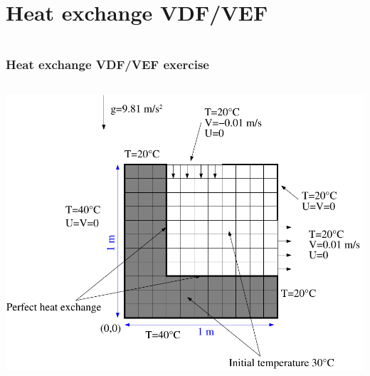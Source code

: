\documentclass[10pt]{beamer}
\begin{document}
\section{Heat exchange VDF/VEF}
\begin{frame}
\begin{columns}[c] 
\tableofcontents[sections={1-6},currentsection, currentsubsection]
\tableofcontents[sections={7-12},currentsection, currentsubsection]
\end{columns}
\end{frame}
\begin{frame}
\frametitle{Heat exchange VDF/VEF exercise}
\begin{block}{}


\begin{columns}[c] 
\begin{center}
\includegraphics[width=1.\textwidth]{PICTURES/heat_exchange.pdf}
\end{center}


\end{columns}
\end{block}
\end{frame}
\end{document}
